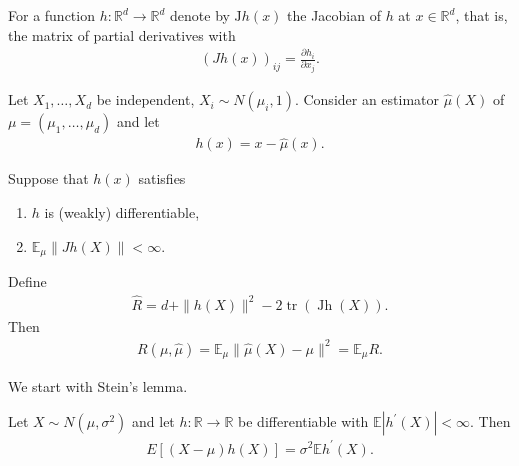 For a function $h: \mathbb{R}^d \rightarrow \mathbb{R}^d$ denote by $\mathrm{J} h(x)$ the Jacobian of $h$ at $x \in \mathbb{R}^d$, that is, the matrix of partial derivatives with
\begin{align*}
(J h(x))_{i j}=\frac{\partial h_i}{\partial x_j} .
\end{align*}

\begin{prop}
     Let $X_1, \ldots, X_d$ be independent, $X_i \sim N\left(\mu_i, 1\right)$. Consider an estimator $\widehat{\mu}(X)$ of $\mu= \left(\mu_1, \ldots, \mu_d\right)$ and let
\begin{align*}
h(x)=x-\widehat{\mu}(x) .
\end{align*}

Suppose that $h(x)$ satisfies
\begin{enumerate}
    \item $h$ is (weakly) differentiable,
    \item $\mathbb{E}_\mu\|J h(X)\|<\infty$.
\end{enumerate}
Define
\begin{align*}
\hat{R}=d+\|h(X)\|^2-2 \operatorname{tr}(\operatorname{Jh}(X)) .
\end{align*}
Then
\begin{align*}
R(\mu, \widehat{\mu})=\mathbb{E}_\mu\|\widehat{\mu}(X)-\mu\|^2=\mathbb{E}_\mu R .
\end{align*}
\end{prop}

We start with Stein's lemma.
\begin{lem} 
Let $X \sim N\left(\mu, \sigma^2\right)$ and let $h: \mathbb{R} \rightarrow \mathbb{R}$ be differentiable with $\mathbb{E}\left|h^{\prime}(X)\right|<\infty$. Then
\begin{align*}
E[(X-\mu) h(X)]=\sigma^2 \mathbb{E} h^{\prime}(X) .
\end{align*}
\end{lem}


